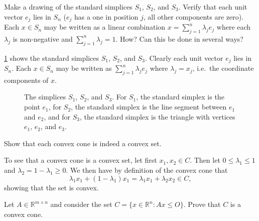 \begin{exercise}
  Make a drawing of the standard simplices $S_1$, $S_2$, and $S_3$.
  Verify that each unit vector $e_j$ lies in $S_n$ ($e_j$ has a one in position $j$, all other components are zero).
  Each $x \in S_n$ may be written as a linear combination $x = \sum_{j=1}^{n} \lambda_j e_j$ where each $\lambda_j$ is non-negative and $\sum_{j = 1}^{n} \lambda_j = 1$.
  How?
  Can this be done in several ways?
\end{exercise}

\begin{solution}

  \cref{fig:simplices} shows the standard simplices $S_1$, $S_2$, and $S_3$.
  Clearly each unit vector $e_j$ lies in $S_n$.
  Each $x \in S_n$ may be written as $\sum_{j=1}^{n} \lambda_j e_j$ where $\lambda_j = x_j$, i.e.\ the coordinate components of $x$.

  \begin{figure}[htbp]
    \centering

    \resizebox{0.9\textwidth}{!}{
      
    }
    \caption{
      The simplices $S_1$, $S_2$, and $S_3$.
      For $S_1$, the standard simplex is the point $e_1$,
      for $S_2$, the standard simplex is the line segment between $e_1$ and $e_2$,
      and for $S_3$, the standard simplex is the triangle with vertices $e_1$, $e_2$, and $e_3$.\label{fig:simplices}
    }
  \end{figure}
\end{solution}

\begin{exercise}
  Show that each convex cone is indeed a convex set.
\end{exercise}

\begin{solution}
  To see that a convex cone is a convex set, let first $x_1,x_2 \in C$.
  Then let $0 \leq \lambda_1 \leq 1$ and $\lambda_2 = 1 - \lambda_1 \geq 0$.
  We then have by definition of the convex cone that
  \begin{equation}
    \lambda_1 x_1 + (1 - \lambda_1) x_1 = \lambda_1 x_1 + \lambda_2 x_2 \in C,
  \end{equation}
  showing that the set is convex.
\end{solution}

\begin{exercise}
  Let $A \in \mathbb{R}^{m \times n}$ and consider the set $C = \{ x \in \mathbb{R}^n : Ax \leq O \}$.
  Prove that $C$ is a convex cone.
\end{exercise}

